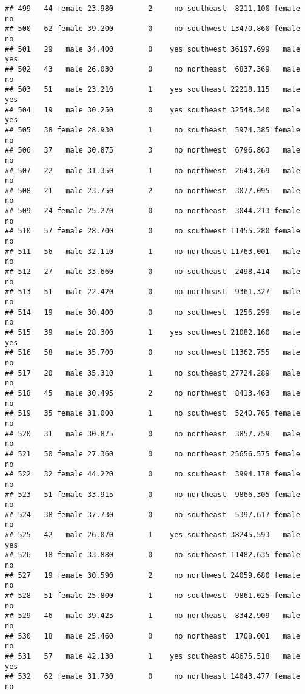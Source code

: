 \documentclass[
]{article}
\begin{document}
\begin{verbatim}
## 499   44 female 23.980        2     no southeast  8211.100 female       no
## 500   62 female 39.200        0     no southwest 13470.860 female       no
## 501   29   male 34.400        0    yes southwest 36197.699   male      yes
## 502   43   male 26.030        0     no northeast  6837.369   male       no
## 503   51   male 23.210        1    yes southeast 22218.115   male      yes
## 504   19   male 30.250        0    yes southeast 32548.340   male      yes
## 505   38 female 28.930        1     no southeast  5974.385 female       no
## 506   37   male 30.875        3     no northwest  6796.863   male       no
## 507   22   male 31.350        1     no northwest  2643.269   male       no
## 508   21   male 23.750        2     no northwest  3077.095   male       no
## 509   24 female 25.270        0     no northeast  3044.213 female       no
## 510   57 female 28.700        0     no southwest 11455.280 female       no
## 511   56   male 32.110        1     no northeast 11763.001   male       no
## 512   27   male 33.660        0     no southeast  2498.414   male       no
## 513   51   male 22.420        0     no northeast  9361.327   male       no
## 514   19   male 30.400        0     no southwest  1256.299   male       no
## 515   39   male 28.300        1    yes southwest 21082.160   male      yes
## 516   58   male 35.700        0     no southwest 11362.755   male       no
## 517   20   male 35.310        1     no southeast 27724.289   male       no
## 518   45   male 30.495        2     no northwest  8413.463   male       no
## 519   35 female 31.000        1     no southwest  5240.765 female       no
## 520   31   male 30.875        0     no northeast  3857.759   male       no
## 521   50 female 27.360        0     no northeast 25656.575 female       no
## 522   32 female 44.220        0     no southeast  3994.178 female       no
## 523   51 female 33.915        0     no northeast  9866.305 female       no
## 524   38 female 37.730        0     no southeast  5397.617 female       no
## 525   42   male 26.070        1    yes southeast 38245.593   male      yes
## 526   18 female 33.880        0     no southeast 11482.635 female       no
## 527   19 female 30.590        2     no northwest 24059.680 female       no
## 528   51 female 25.800        1     no southwest  9861.025 female       no
## 529   46   male 39.425        1     no northeast  8342.909   male       no
## 530   18   male 25.460        0     no northeast  1708.001   male       no
## 531   57   male 42.130        1    yes southeast 48675.518   male      yes
## 532   62 female 31.730        0     no northeast 14043.477 female       no

\end{verbatim}
\end{document}
